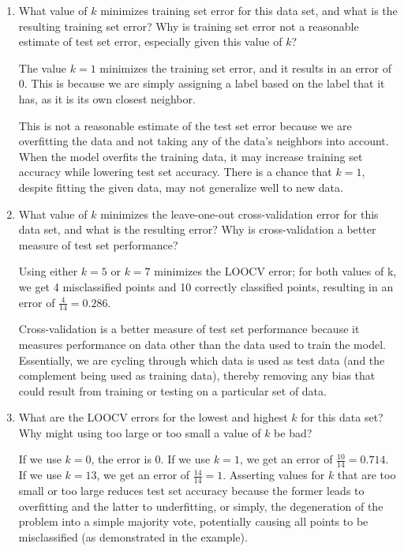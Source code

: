 \documentclass[11pt]{article}
\newcommand{\sol}[1]{{\bf{\color{magenta}{{Solution:}}}}}
\begin{document}
\begin{enumerate}
\item {} What value of $k$ minimizes training set error for this data set, and what is the resulting training set error? Why is training set error not a reasonable estimate of test set error, especially given this value of $k$?

\sol x The value $k = 1$ minimizes the training set error, and it results in an error of 0. This is because we are simply assigning a label based on the label that it has, as it is its own closest neighbor. 

This is not a reasonable estimate of the test set error because we are overfitting the data and not taking any of the data's neighbors into account. When the model overfits the training data, it may increase training set accuracy while lowering test set accuracy. There is a chance that $k = 1$, despite fitting the given data, may not generalize well to new data.

\item {} What value of $k$ minimizes the leave-one-out cross-validation error for this data set, and what is the resulting error? Why is cross-validation a better measure of test set performance?

\sol x Using either $k = 5$ or $k = 7$ minimizes the LOOCV error; for both values of k, we get 4 misclassified points and 10 correctly classified points, resulting in an error of $\frac{4}{14} = 0.286$.

Cross-validation is a better measure of test set performance because it measures performance on data other than the data used to train the model. Essentially, we are cycling through which data is used as test data (and the complement being used as training data), thereby removing any bias that could result from training or testing on a particular set of data.

\item {} What are the LOOCV errors for the lowest and highest $k$ for this data set? Why might using too large or too small a value of $k$ be bad?

\sol x If we use $k = 0$, the error is 0. If we use $k = 1$, we get an error of $\frac{10}{14} = 0.714$. If we use $k = 13$, we get an error of $\frac{14}{14} = 1$. Asserting values for $k$ that are too small or too large reduces test set accuracy because the former leads to overfitting and the latter to underfitting, or simply, the degeneration of the problem into a simple majority vote, potentially
causing all points to be misclassified (as demonstrated in the example).

\end{enumerate}


\end{document}
